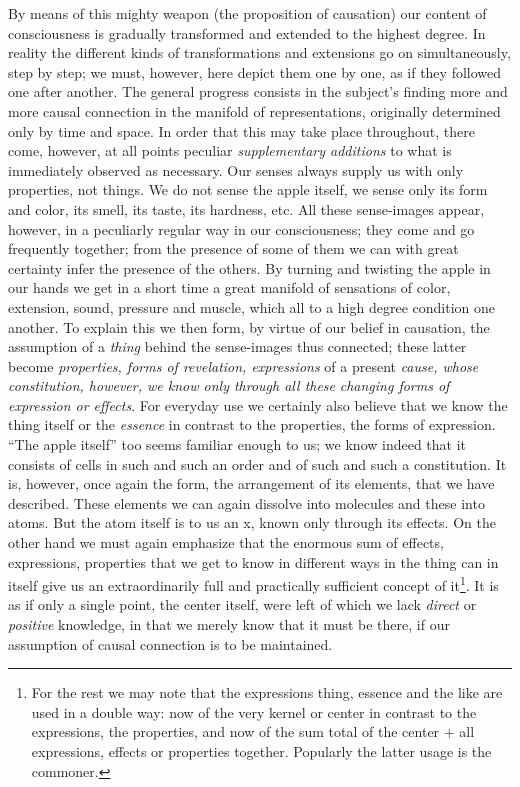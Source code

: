 \documentclass[12pt,a4paper,openany]{book}
\newcommand{\opage}[1]{\marginnote{\footnotesize\textit{[#1]}}}
\begin{document}
\setcounter{footnote}{0}%
\opage{249}By means of this mighty weapon (the proposition of causation) our content of
consciousness is gradually transformed and extended to the highest degree. In reality the
different kinds of transformations and extensions go on simultaneously, step by step; we
must, however, here depict them one by one, as if they followed one after another. The
general progress consists in the subject's finding more and more causal connection in the
manifold of representations, originally determined only by time and space. In order that
this may take place throughout, there come, however, at all points peculiar
\emph{supplementary additions} to what is immediately observed as necessary. Our senses
always supply us with only properties, not things. We do not sense the apple itself, we
sense only its form and color, its smell, its taste, its hardness, etc. All these
sense-images appear, however, in a peculiarly regular way in our consciousness; they come
and go frequently together; from the presence of some of them we can with great certainty
infer the presence of the others. By turning and twisting the apple in our hands we get
in a short time a great manifold of sensations of color, extension, sound, pressure and
muscle, which all to a high degree condition one another. To explain this we then form,
by virtue of our belief in causation, the assumption of a \emph{thing} behind the
sense-images thus connected; these latter become \emph{properties, forms of revelation,
expressions} of a present \emph{cause, whose constitution, however, we know only through
all these}
\emph{changing forms of expression or effects}.
For everyday use we certainly also believe that we know the thing itself or the
\emph{essence} in contrast to the properties, the forms of expression. ``The apple
itself'' too seems familiar enough to us; we know indeed that it consists of cells in
such and such an order and of such and such a constitution. It is, however, once again
the form, the arrangement of its elements, that we have described. These elements we can
again dissolve into molecules and these into atoms.
\setcounter{footnote}{0}%
\opage{250}But the atom itself is to us an x, known only through its effects. On the other hand we
must again emphasize that the enormous sum of effects, expressions, properties that we
get to know in different ways in the thing can in itself give us an extraordinarily full
and practically sufficient concept of it\footnote[1]{For the rest we may note that the expressions thing, essence and the like are used in a double way: now of the very kernel or center in contrast to the expressions, the properties, and now of the sum total of the center + all expressions, effects or properties together. Popularly the latter usage is the commoner.}. It is as if only a single point, the center itself,
were left of which we lack \emph{direct} or \emph{positive} knowledge, in that we merely
know that it must be there, if our assumption of causal connection is to be maintained.
\end{document}
